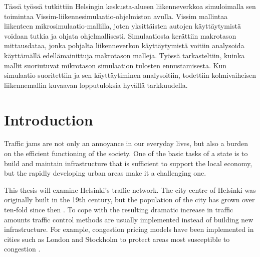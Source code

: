 \documentclass[english, 12pt, a4paper, elec, utf8, pdfa, online]{aaltothesis}
\newcommand{\pubdate}{11.5.2018}
\begin{document}
\begin{abstractpage}[finnish]
{    Tässä työssä tutkittiin Helsingin keskusta-alueen liikenneverkkoa simuloimalla sen toimintaa Vissim-liikennesimulaatio-ohjelmiston avulla. Vissim mallintaa liikenteen mikrosimulaatio-mallilla, joten yksittäisten autojen käyttäytymistä voidaan tutkia ja ohjata ohjelmallisesti. Simulaatiosta kerättiin makrotason mittausdataa, jonka pohjalta liikenneverkon käyttäytymistä voitiin analysoida käyttämällä edellämainittuja makrotason malleja. Työssä tarkasteltiin, kuinka mallit suoriutuvat mikrotason simulaation tulosten ennustamisesta. Kun simulaatio suoritettiin ja sen käyttäytiminen analysoitiin, todettiin kolmivaiheisen liikennemallin kuvaavan lopputuloksia hyvällä tarkkuudella.
    }

\end{abstractpage}

\newpage






\thesistableofcontents

\cleardoublepage

\section{Introduction}

\thispagestyle{empty}

Traffic jams are not only an annoyance in our everyday lives, but also a burden on the efficient functioning of the society. One of the basic tasks of a state is to build and maintain infrastructure that is sufficient to support the local economy, but the rapidly developing urban areas make it a challenging one.

This thesis will examine Helsinki's traffic network. The city centre of Helsinki was originally built in the 19th century, but the population of the city has grown over ten-fold since then \cite{helsinki}. To cope with the resulting dramatic increase in traffic amounts traffic control methods are usually implemented instead of building new infrastructure. For example, congestion pricing models have been implemented in cities such as London and Stockholm to protect areas most susceptible to congestion \cite{congestionpricing}.
\end{document}
